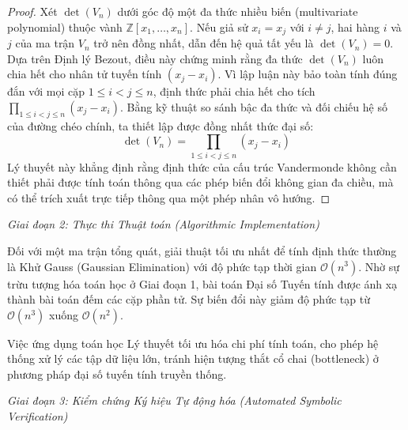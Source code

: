 \documentclass{article}
\begin{document}
\begin{proof}
Xét $\det(V_n)$ dưới góc độ một đa thức nhiều biến (multivariate polynomial) thuộc vành $\mathbb{Z}[x_1, \dots, x_n]$. Nếu giả sử $x_i = x_j$ với $i \ne j$, hai hàng $i$ và $j$ của ma trận $V_n$ trở nên đồng nhất, dẫn đến hệ quả tất yếu là $\det(V_n) = 0$. Dựa trên Định lý Bezout, điều này chứng minh rằng đa thức $\det(V_n)$ luôn chia hết cho nhân tử tuyến tính $(x_j - x_i)$. Vì lập luận này bảo toàn tính đúng đắn với mọi cặp $1 \le i < j \le n$, định thức phải chia hết cho tích $\prod_{1 \le i < j \le n} (x_j - x_i)$. Bằng kỹ thuật so sánh bậc đa thức và đối chiếu hệ số của đường chéo chính, ta thiết lập được đồng nhất thức đại số:
\begin{equation*}
 \det(V_n) = \prod_{1 \le i < j \le n} (x_j - x_i)
\end{equation*}
Lý thuyết này khẳng định rằng định thức của cấu trúc Vandermonde không cần thiết phải được tính toán thông qua các phép biến đổi không gian đa chiều, mà có thể trích xuất trực tiếp thông qua một phép nhân vô hướng.
\end{proof}

\vspace{0.5em}\noindent\emph{Giai đoạn 2: Thực thi Thuật toán (Algorithmic Implementation)}

Đối với một ma trận tổng quát, giải thuật tối ưu nhất để tính định thức thường là Khử Gauss (Gaussian Elimination) với độ phức tạp thời gian $\mathcal{O}(n^3)$. Nhờ sự trừu tượng hóa toán học ở Giai đoạn 1, bài toán Đại số Tuyến tính được ánh xạ thành bài toán đếm các cặp phần tử. Sự biến đổi này giảm độ phức tạp từ $\mathcal{O}(n^3)$ xuống $\mathcal{O}(n^2)$.

Việc ứng dụng toán học Lý thuyết tối ưu hóa chi phí tính toán, cho phép hệ thống xử lý các tập dữ liệu lớn, tránh hiện tượng thắt cổ chai (bottleneck) ở phương pháp đại số tuyến tính truyền thống.

\vspace{0.5em}\noindent\emph{Giai đoạn 3: Kiểm chứng Ký hiệu Tự động hóa (Automated Symbolic Verification)}
\end{document}
